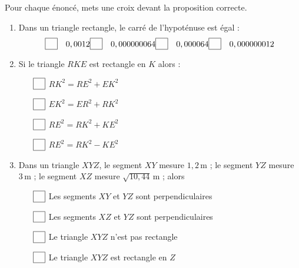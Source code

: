 \medskip

Pour chaque énoncé, mets une croix devant la proposition correcte. 

\begin{enumerate}
\setlength\itemsep{1em}
\fboxsep=1pt
\item Dans un triangle rectangle, le carré de l’hypoténuse est égal :
\[\hfill \fbox{\phantom{\checkmark}}\quad 0,0012 \hfill \fbox{\phantom{\checkmark}}\quad 0,000000064 \hfill \fbox{\phantom{\checkmark}}\quad 0,000064 \hfill \fbox{\phantom{\checkmark}}\quad 0,000000012 \hfill\]
\item Si le triangle $RKE$ est rectangle en $K$ alors :
\begin{multicols}{2}
\begin{enumerate}
\item[$\fbox{\phantom{\checkmark}}$] $RK^2=RE^2+EK^2$
\item[$\fbox{\phantom{\checkmark}}$] $EK^2=ER^2+RK^2$
\item[$\fbox{\phantom{\checkmark}}$] $RE^2=RK^2+KE^2$
\item[$\fbox{\phantom{\checkmark}}$] $RE^2=RK^2-KE^2$
\end{enumerate}
\end{multicols}
\item Dans un triangle $XYZ$, le segment $XY$ mesure $1,2\,\text{m}$ ; le segment $YZ$ mesure $3\,\text{m}$ ; le segment $XZ$ mesure $\sqrt{10,44}\,\text{m}$ ; alors 

    \begin{enumerate}
    \item[$\fbox{\phantom{\checkmark}}$] Les segments $XY$ et $YZ$ sont perpendiculaires

    \item[$\fbox{\phantom{\checkmark}}$] Les segments $XZ$ et $YZ$ sont perpendiculaires

    \item[$\fbox{\phantom{\checkmark}}$] Le triangle $XYZ$ n’est pas rectangle

    \item[$\fbox{\phantom{\checkmark}}$] Le triangle $XYZ$ est rectangle en $Z$
    \end{enumerate}
\end{enumerate}